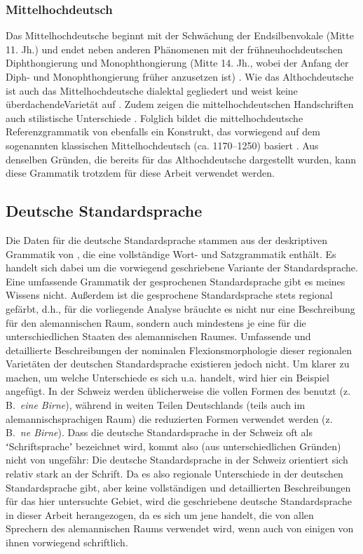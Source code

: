 \subsubsection{Mittelhochdeutsch}

Das Mittelhochdeutsche beginnt mit der Schwächung der Endsilbenvokale (Mitte 11. Jh.) und endet neben anderen Phänomenen mit der frühneuhochdeutschen Diphthongierung und Monophthongierung (Mitte 14. Jh., wobei der Anfang der Diph- und Monophthongierung früher anzusetzen ist) \citep[18–21]{Paul2007}. Wie das Althochdeutsche ist auch das Mittelhochdeutsche dialektal gegliedert und weist keine überdachende\largerpage Varietät auf \citep[34]{Paul2007}. Zudem zeigen die mittelhochdeutschen Handschriften auch stilistische Unterschiede \citep[11]{Paul2007}. Folglich bildet die mittelhochdeutsche Referenzgrammatik von \citet{Paul2007} ebenfalls ein Konstrukt, das vorwiegend auf dem sogenannten klassischen Mittelhochdeutsch (ca. 1170–1250) basiert \citep[10]{Paul2007}. Aus denselben Gründen, die bereits für das Althochdeutsche dargestellt wurden, kann diese Grammatik trotzdem für diese Arbeit verwendet werden.

\subsection{Deutsche Standardsprache}\label{3.3.2}
\largerpage
Die Daten für die deutsche Standardsprache stammen aus der deskriptiven Grammatik von \citet{Eisenberg2006}, die eine vollständige Wort- und Satzgrammatik enthält. Es handelt sich dabei um die vorwiegend geschriebene Variante der Standardsprache. Eine umfassende Grammatik der gesprochenen Standardsprache gibt es meines Wissens nicht. Außerdem ist die gesprochene Standardsprache stets regional gefärbt, d.h., für die vorliegende Analyse bräuchte es nicht nur eine Beschreibung für den alemannischen Raum, sondern auch mindestens je eine für die unterschiedlichen Staaten des alemannischen Raumes. Umfassende und detaillierte Beschreibungen der nominalen Flexionsmorphologie dieser regionalen Varietäten der deutschen Standardsprache existieren jedoch nicht. Um klarer zu machen, um welche Unterschiede es sich u.a. handelt, wird hier ein Beispiel angefügt. In der Schweiz werden üblicherweise die vollen Formen des  benutzt (z.\,B.\ \textit{eine Birne}), während in weiten Teilen Deutschlands (teils auch im alemannischsprachigen Raum) die reduzierten Formen verwendet werden (z.\,B.\ \textit{ne Birne}). Dass die deutsche Standardsprache in der Schweiz oft als ʻSchriftspracheʼ bezeichnet wird, kommt also (aus unterschiedlichen Gründen) nicht von ungefähr: Die deutsche Standardsprache in der Schweiz orientiert sich relativ stark an der Schrift. Da es also regionale Unterschiede in der deutschen Standardsprache gibt, aber keine vollständigen und detaillierten Beschreibungen für das hier untersuchte Gebiet, wird die geschriebene deutsche Standardsprache in dieser Arbeit herangezogen, da es sich um jene  handelt, die von allen Sprechern des alemannischen Raums verwendet wird, wenn auch von einigen von ihnen vorwiegend schriftlich.

